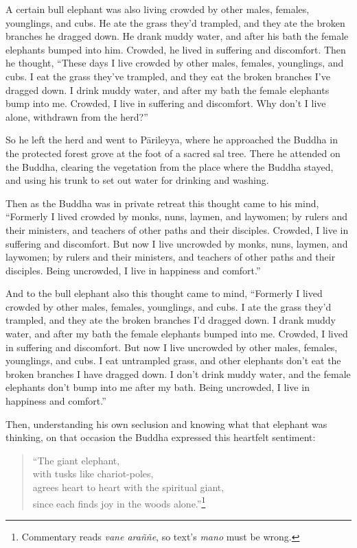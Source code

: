 \documentclass[12pt,openany]{book}%
\begin{document}
A certain bull elephant was also living crowded by other males, females, younglings, and cubs. He ate the grass they’d trampled, and they ate the broken branches he dragged down. He drank muddy water, and after his bath the female elephants bumped into him. Crowded, he lived in suffering and discomfort. Then he thought, “These days I live crowded by other males, females, younglings, and cubs. I eat the grass they’ve trampled, and they eat the broken branches I’ve dragged down. I drink muddy water, and after my bath the female elephants bump into me. Crowded, I live in suffering and discomfort. Why don’t I live alone, withdrawn from the herd?” 

So he left the herd and went to \textsanskrit{Pārileyya}, where he approached the Buddha in the protected forest grove at the foot of a sacred sal tree. There he attended on the Buddha, clearing the vegetation from the place where the Buddha stayed, and using his trunk to set out water for drinking and washing. 

Then as the Buddha was in private retreat this thought came to his mind, “Formerly I lived crowded by monks, nuns, laymen, and laywomen; by rulers and their ministers, and teachers of other paths and their disciples. Crowded, I live in suffering and discomfort. But now I live uncrowded by monks, nuns, laymen, and laywomen; by rulers and their ministers, and teachers of other paths and their disciples. Being uncrowded, I live in happiness and comfort.” 

And to the bull elephant also this thought came to mind, “Formerly I lived crowded by other males, females, younglings, and cubs. I ate the grass they’d trampled, and they ate the broken branches I’d dragged down. I drank muddy water, and after my bath the female elephants bumped into me. Crowded, I lived in suffering and discomfort. But now I live uncrowded by other males, females, younglings, and cubs. I eat untrampled grass, and other elephants don’t eat the broken branches I have dragged down. I don’t drink muddy water, and the female elephants don’t bump into me after my bath. Being uncrowded, I live in happiness and comfort.” 

Then, understanding his own seclusion and knowing what that elephant was thinking, on that occasion the Buddha expressed this heartfelt sentiment: 

\begin{verse}%
“The giant elephant, \\
with tusks like chariot-poles, \\
agrees heart to heart with the spiritual giant, \\
since each finds joy in the woods alone.”\footnote{Commentary reads \textit{vane \textsanskrit{araññe}}, so text’s \textit{mano} must be wrong. } 

%
\end{verse}
\end{document}

